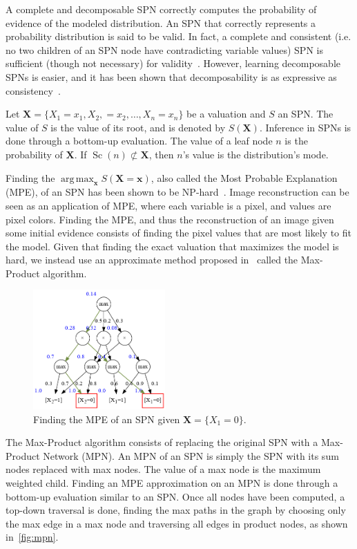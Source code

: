 \documentclass{article}
\DeclareMathOperator*{\argmax}{arg\,max}
\DeclareMathOperator*{\Sc}{\text{Sc}}
\begin{document}
A complete and decomposable SPN correctly computes the probability of evidence of the modeled
distribution. An SPN that correctly represents a probability distribution is said to be valid. In
fact, a complete and consistent (i.e. no two children of an SPN node have contradicting variable
values) SPN is sufficient (though not necessary) for validity~\cite{poon11}. However,
learning decomposable SPNs is easier, and it has been shown that decomposability is as expressive
as consistency~\cite{peharz15}.

Let $\mathbf{X}=\{X_1=x_1,X_2,=x_2,\ldots,X_n=x_n\}$ be a valuation and $S$ an SPN. The value of
$S$ is the value of its root, and is denoted by $S(\mathbf{X})$. Inference in SPNs is done through
a bottom-up evaluation. The value of a leaf node $n$ is the probability of $\mathbf{X}$. If
$\Sc(n)\not\subset\mathbf{X}$, then $n$'s value is the distribution's mode.

Finding the $\argmax_{\mathbf{x}} S(\mathbf{X}=\mathbf{x})$, also called the Most Probable
Explanation (MPE), of an SPN has been shown to be NP-hard~\cite{peharz15,mei18,conaty17}. Image
reconstruction can be seen as an application of MPE, where each variable is a pixel, and values are
pixel colors. Finding the MPE, and thus the reconstruction of an image given some initial evidence
consists of finding the pixel values that are most likely to fit the model. Given that finding the
exact valuation that maximizes the model is hard, we instead use an approximate method proposed
in~\cite{poon11} called the Max-Product algorithm.

\begin{figure}[t]
  \centering\centerline{\includegraphics[width=0.45\textwidth]{imgs/sample_mpn_prob.png}}
  \caption{Finding the MPE of an SPN given $\mathbf{X}=\{X_1=0\}$.\label{fig:mpn}}
\end{figure}

The Max-Product algorithm consists of replacing the original SPN with a Max-Product Network (MPN).
An MPN of an SPN is simply the SPN with its sum nodes replaced with max nodes. The value of a max
node is the maximum weighted child. Finding an MPE approximation on an MPN is done through a
bottom-up evaluation similar to an SPN. Once all nodes have been computed, a top-down traversal is
done, finding the max paths in the graph by choosing only the max edge in a max node and traversing
all edges in product nodes, as shown in~\autoref{fig:mpn}.
\end{document}

